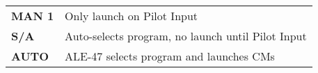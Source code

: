 
    
    \begin{tabular}{ l | l }
      \textbf{MAN 1} & Only launch on Pilot Input \\
      \textbf{S/A} & Auto-selects program, no launch until Pilot Input \\
      \textbf{AUTO} & ALE-47 selects program and launches CMs \\
    \end{tabular}
